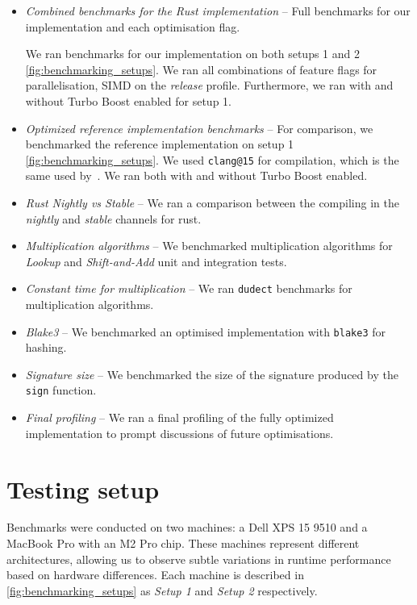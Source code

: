 \documentclass[11pt]{report}
\theoremstyle{definition}
\theoremstyle{plain}
\begin{document}
\begin{itemize}[parsep=0pt, itemsep=3pt]
  \item \textit{Combined benchmarks for the Rust implementation} -- Full benchmarks for our implementation and each optimisation flag.

        We ran benchmarks for our implementation on both setups 1 and 2 \autoref{fig:benchmarking_setups}. We ran all combinations of feature flags for parallelisation, SIMD on the \textit{release} profile. Furthermore, we ran with and without Turbo Boost enabled for setup 1.
  \item \textit{Optimized reference implementation benchmarks} -- For comparison, we benchmarked the reference implementation on setup 1 \autoref{fig:benchmarking_setups}. We used \texttt{clang@15} for compilation, which is the same used by~\cite{aguilarsyndrome11}. We ran both with and without Turbo Boost enabled.
  \item \textit{Rust Nightly vs Stable} -- We ran a comparison between the compiling in the \textit{nightly} and \textit{stable} channels for rust.
  \item \textit{Multiplication algorithms} -- We benchmarked multiplication algorithms for \textit{Lookup} and \textit{Shift-and-Add} unit and integration tests.
  \item \textit{Constant time for multiplication} -- We ran \texttt{dudect} benchmarks for multiplication algorithms.
  \item \textit{Blake3} -- We benchmarked an optimised implementation with \texttt{blake3} for hashing.
  \item \textit{Signature size} -- We benchmarked the size of the signature produced by the \texttt{sign} function.
  \item \textit{Final profiling} -- We ran a final profiling of the fully optimized implementation to prompt discussions of future optimisations.
\end{itemize}

\section{Testing setup}\label{sub:testing_setup}

Benchmarks were conducted on two machines: a Dell XPS 15 9510 and a MacBook Pro with an M2 Pro chip. These machines represent different architectures, allowing us to observe subtle variations in runtime performance based on hardware differences. Each machine is described in \autoref{fig:benchmarking_setups} as \textit{Setup 1} and \textit{Setup 2} respectively.
\end{document}
